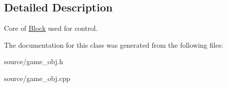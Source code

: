 \subsection{Detailed Description}
Core of \hyperlink{class_block}{Block} used for control. 

The documentation for this class was generated from the following files\-:\begin{DoxyCompactItemize}
\item 
source/game\-\_\-obj.\-h\item 
source/game\-\_\-obj.\-cpp\end{DoxyCompactItemize}
